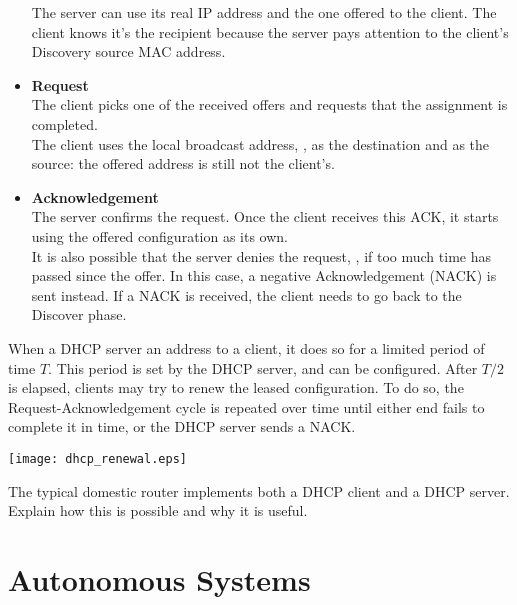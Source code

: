 \begin{itemize}
The server can use its real IP address and the one offered to the client.
The client knows it's the recipient because the server pays attention to the 
client's Discovery source MAC address.

\vspace{0.25cm}
\item \textbf{Request}\\
The client picks one of the received offers and requests that the 
assignment is completed.\\[-0.3cm]

The client uses the local broadcast
address, , as the destination and 
 as the source: the offered address is still not the client's.

\vspace{0.25cm}
\item \textbf{Acknowledgement}\\
The server confirms the request. Once the client receives this ACK,
it starts using the offered configuration as its own. \\[-0.3cm]

It is also possible that the server denies the request, \eg, if 
too much time has passed since the offer. In this case, 
a negative Acknowledgement (NACK) is sent instead. If a NACK is received,
the client needs to go back to the Discover phase.
\end{itemize}

When a DHCP server  an address to a client, it does 
so for a limited period of time $T$. This period is set by the DHCP server, and can be configured.
After $T/2$ is elapsed, clients may try to renew the leased configuration. To do so,
the Request-Acknowledgement cycle is repeated over time until either end fails to complete it in time,
or the DHCP server sends a NACK.

\begin{center}
\texttt{[image: dhcp\_renewal.eps]}
\end{center}

\begin{exercise}
The typical domestic router implements both a DHCP client and a DHCP server.
Explain how this is possible and why it is useful.
\end{exercise}


\section{Autonomous Systems}

